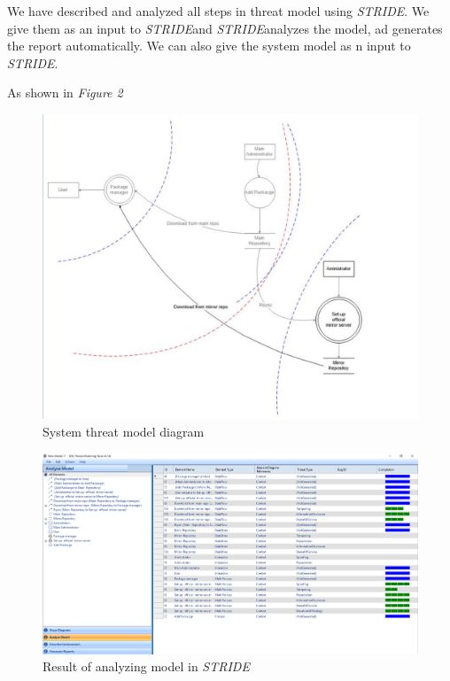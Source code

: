\documentclass{IEEEtran}
\newcommand{\stride}{\emph{STRIDE}}
\begin{document}
We have described and analyzed all steps in threat model using \stride. We give them as an input to \stride and \stride analyzes the model, ad generates the report automatically. We can also give the system model as n input to \stride. 

As shown in \emph{Figure 2}
\begin{figure}[ht]
	\centering
	\includegraphics[width=1.0\linewidth]{figures/model}
	\caption[Partial model for motivation example Android app version]{\label{f:stridemodel}System threat model diagram}
\end{figure}

\begin{figure}[ht]
	\centering
	\includegraphics[width=1.0\linewidth]{figures/analyze-model}
	\caption[Partial model for motivation example Android app version]{\label{f:stridemodel}Result of analyzing model in \stride}
\end{figure}
\end{document}
